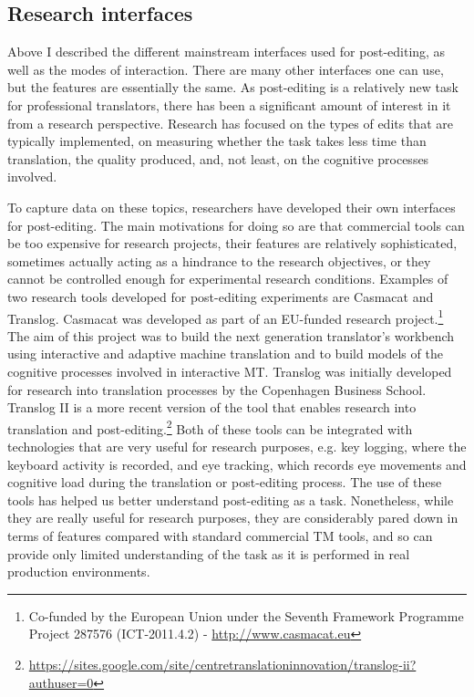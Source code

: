 \documentclass[output=paper,colorlinks,citecolor=brown]{langscibook}
\begin{document}
\subsection{Research interfaces}

Above I described the different mainstream interfaces used for post-editing, as well as the modes of interaction. There are many other interfaces one can use, but the features are essentially the same. As post-editing is a relatively new task for professional translators, there has been a significant amount of interest in it from a research perspective. Research has focused on the types of edits that are typically implemented, on measuring whether the task takes less time than translation, the quality produced, and, not least, on the cognitive processes involved.

To capture data on these topics, researchers have developed their own interfaces for post-editing. The main motivations for doing so are that commercial tools can be too expensive for research projects, their features are relatively sophisticated, sometimes actually acting as a hindrance to the research objectives, or they cannot be controlled enough for experimental research conditions. Examples of two research tools developed for post-editing experiments are Casmacat and Translog. Casmacat was developed as part of an EU-funded research project.\footnote{Co-funded by the European Union under the Seventh Framework Programme Project 287576 (ICT-2011.4.2) - \url{http://www.casmacat.eu}} The aim of this project was to build the next generation translator’s workbench using interactive and adaptive machine translation and to build models of the cognitive processes involved in interactive MT. Translog was initially developed for research into translation processes by the Copenhagen Business School. Translog II is a more recent version of the tool that enables research into translation and post-editing.\footnote{\url{https://sites.google.com/site/centretranslationinnovation/translog-ii?authuser=0}} Both of these tools can be integrated with technologies that are very useful for research purposes, e.g. key logging, where the keyboard activity is recorded, and eye tracking, which records eye movements and cognitive load during the translation or post-editing process. The use of these tools has helped us better understand post-editing as a task. Nonetheless, while they are really useful for research purposes, they are considerably pared down in terms of features compared with standard commercial TM tools, and so can provide only limited understanding of the task as it is performed in real production environments.
\end{document}
